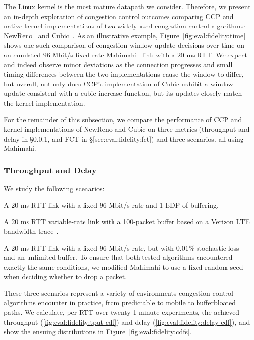 The Linux kernel is the most mature datapath we consider. Therefore, we present an in-depth exploration of congestion control outcomes comparing CCP and native-kernel implementations of two widely used congestion control algorithms: NewReno~\cite{newreno} and Cubic~\cite{cubic}. 
As an illustrative example, Figure~\ref{fig:eval:fidelity:time} shows one such comparison of congestion window update decisions over time on an emulated $96$ Mbit/s fixed-rate Mahimahi~\cite{mahimahi} link with a $20$ ms RTT.
We expect and indeed observe minor deviations as the connection progresses and small timing differences between the two implementations cause the window to differ, but overall,
not only does CCP's implementation of Cubic exhibit a window update consistent with a cubic increase function, but its updates closely match the kernel implementation.

For the remainder of this subsection, we compare the performance of CCP and kernel implementations of NewReno and Cubic on three metrics (throughput and delay in \S\ref{sec:eval:fidelity:tput-delay}, and FCT in \S\ref{sec:eval:fidelity:fct}) and three scenarios, all using Mahimahi.

\subsubsection{Throughput and Delay}
\label{sec:eval:fidelity:tput-delay}

We study the following scenarios:

 A 20 ms RTT link with a fixed $96$ Mbit/s rate and 1 BDP of buffering.

 A 20 ms RTT variable-rate link with a 100-packet buffer based on a Verizon LTE bandwidth trace~\cite{mahimahi}.

 A 20 ms RTT link with a fixed $96$ Mbit/s rate, but with $0.01$\% stochastic loss and an unlimited buffer. To ensure that both tested algorithms encountered exactly the same conditions, we modified Mahimahi to use a fixed random seed when deciding whether to drop a packet.

These three scenarios represent a variety of environments congestion control algorithms encounter in practice, from predictable to mobile to bufferbloated paths. We calculate, per-RTT over twenty 1-minute experiments, the achieved throughput (\ref{fig:eval:fidelity:tput-cdf}) and delay (\ref{fig:eval:fidelity:delay-cdf}), and show the ensuing distributions in Figure~\ref{fig:eval:fidelity:cdfs}.


